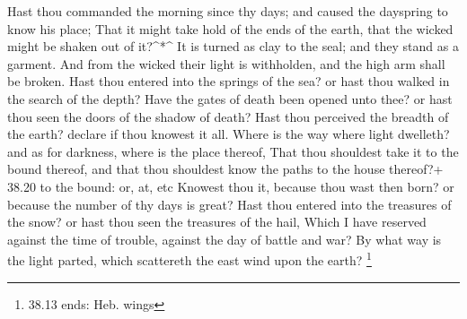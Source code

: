  Hast thou commanded the morning since thy days; and caused
the dayspring to know his place;  That it might take hold
of the ends of the earth, that the wicked might be shaken out of
it?\^{}*\^{}  It is turned as clay to the seal; and they
stand as a garment.  And from the wicked their light is
withholden, and the high arm shall be broken.  Hast thou
entered into the springs of the sea? or hast thou walked in the search
of the depth?  Have the gates of death been opened unto
thee? or hast thou seen the doors of the shadow of death? 
Hast thou perceived the breadth of the earth? declare if thou knowest it
all.  Where is the way where light dwelleth? and as for
darkness, where is the place thereof,  That thou shouldest
take it to the bound thereof, and that thou shouldest know the paths to
the house thereof?+ 38.20 to the bound: or, at, etc 
Knowest thou it, because thou wast then born? or because the number of
thy days is great?  Hast thou entered into the treasures of
the snow? or hast thou seen the treasures of the hail, 
Which I have reserved against the time of trouble, against the day of
battle and war?  By what way is the light parted, which
scattereth the east wind upon the earth? \footnote{38.13 ends: Heb.
  wings}

